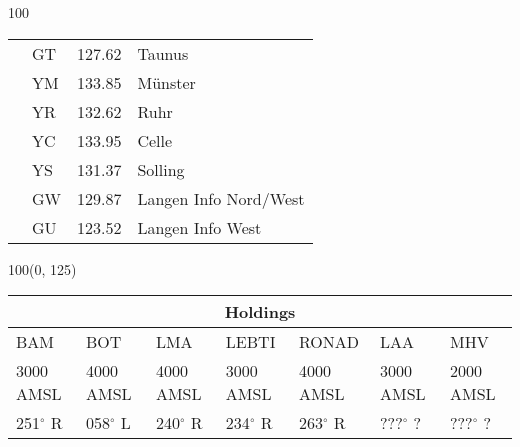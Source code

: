 \documentclass[10pt,landscape,a4paper]{article}
\begin{document}
\begin{textblock}{100}
\begin{table}[]
\begin{tabular}{llll}
\multicolumn{1}{|l|}{}                     & \multicolumn{1}{l|}{GT}          & \multicolumn{1}{l|}{127.62}            & \multicolumn{1}{l|}{Taunus}             \\
\multicolumn{1}{|l|}{}                     & \multicolumn{1}{l|}{YM}          & \multicolumn{1}{l|}{133.85}          & \multicolumn{1}{l|}{Münster}          \\
\multicolumn{1}{|l|}{}                     & \multicolumn{1}{l|}{YR}          & \multicolumn{1}{l|}{132.62}          & \multicolumn{1}{l|}{Ruhr}          \\
\multicolumn{1}{|l|}{}                     & \multicolumn{1}{l|}{YC}          & \multicolumn{1}{l|}{133.95}          & \multicolumn{1}{l|}{Celle}          \\
\multicolumn{1}{|l|}{}                     & \multicolumn{1}{l|}{YS}          & \multicolumn{1}{l|}{131.37}          & \multicolumn{1}{l|}{Solling}          \\
\multicolumn{1}{|l|}{}                     & \multicolumn{1}{l|}{GW}          & \multicolumn{1}{l|}{129.87}          & \multicolumn{1}{l|}{Langen Info Nord/West}          \\
\multicolumn{1}{|l|}{}                     & \multicolumn{1}{l|}{GU}          & \multicolumn{1}{l|}{123.52}          & \multicolumn{1}{l|}{Langen Info West}          \\ \hline
\end{tabular}
\end{table}
\end{textblock}

\begin{textblock}{100}(0, 125)
\begin{table}[]
\begin{tabular}{lllllll} 
\multicolumn{7}{c}{\textbf{Holdings}}                                                                                                                                        \\ \hline
\multicolumn{1}{|l|}{BAM} & 
\multicolumn{1}{l|}{BOT}   & 
\multicolumn{1}{l|}{LMA} & 
\multicolumn{1}{l|}{LEBTI} & 
\multicolumn{1}{l|}{RONAD} & 
\multicolumn{1}{l|}{LAA} &
\multicolumn{1}{l|}{MHV} \\ \hline
\multicolumn{1}{|l|}{3000 AMSL} & 
\multicolumn{1}{l|}{4000 AMSL} & 
\multicolumn{1}{l|}{4000 AMSL} & 
\multicolumn{1}{l|}{3000 AMSL} & 
\multicolumn{1}{l|}{4000 AMSL} & 
\multicolumn{1}{l|}{3000 AMSL} & 
\multicolumn{1}{l|}{2000 AMSL} \\
\multicolumn{1}{|l|}{251$^\circ$ R} & 
\multicolumn{1}{l|}{058$^\circ$ L} & 
\multicolumn{1}{l|}{240$^\circ$ R} & 
\multicolumn{1}{l|}{234$^\circ$ R} & 
\multicolumn{1}{l|}{263$^\circ$ R} & 
\multicolumn{1}{l|}{???$^\circ$ ?} & 
\multicolumn{1}{l|}{???$^\circ$ ?} \\ \hline
\end{tabular}
\end{table}
\end{textblock}
\end{document}
